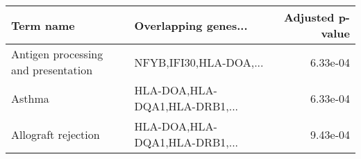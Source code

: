 \begin{tabular}{llr}
\toprule
                          Term name &          Overlapping genes... &  Adjusted p-value \\
\midrule
Antigen processing and presentation &        NFYB,IFI30,HLA-DOA,... &          6.33e-04 \\
                             Asthma & HLA-DOA,HLA-DQA1,HLA-DRB1,... &          6.33e-04 \\
                Allograft rejection & HLA-DOA,HLA-DQA1,HLA-DRB1,... &          9.43e-04 \\
\bottomrule
\end{tabular}
